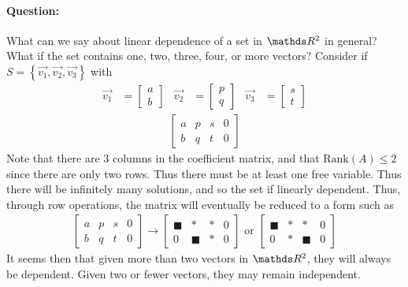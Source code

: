 \documentclass[11pt]{article}
\newcommand{\ques}{\paragraph{Question:}}
\newcommand{\vek}[1]{\vec{#1}}
\begin{document}
\ques What can we say about linear dependence of a set in $\bbR^2$ in general? What if the set contains one, two, three, four, or more vectors? Consider if $S = \left\{ \vek{v_1}, \vek{v_2}, \vek{v_3} \right\}$ with
\begin{align*}
\vek{v_1} &= \begin{bmatrix}a\\b\end{bmatrix}
&
\vek{v_2} &= \begin{bmatrix}p\\q\end{bmatrix}
&
\vek{v_3} &= \begin{bmatrix}s\\t\end{bmatrix}
\end{align*}
\begin{align*}
\left[\begin{matrix}
a & p & s & 0
\\
b & q & t & 0
\end{matrix}\right]
\end{align*}
Note that there are $3$ columns in the coefficient matrix, and that $\text{Rank}(A) \le 2$ since there are only two rows. Thus there must be at least one free variable. Thus there will be infinitely many solutions, and so the set if linearly dependent. Thus, through row operations, the matrix will eventually be reduced to a form such as
\begin{align*}
\left[\begin{matrix}
a & p & s & 0
\\
b & q & t & 0
\end{matrix}\right]
\longrightarrow
\left[\begin{matrix}
\blacksquare & * & * & 0
\\
0 & \blacksquare & * & 0
\end{matrix}\right]
\text{ or }
\left[\begin{matrix}
\blacksquare & * & * & 0
\\
0 & * & \blacksquare & 0
\end{matrix}\right]
\end{align*}
It seems then that given more than two vectors in $\bbR^2$, they will always be dependent. Given two or fewer vectors, they may remain independent.
\end{document}
